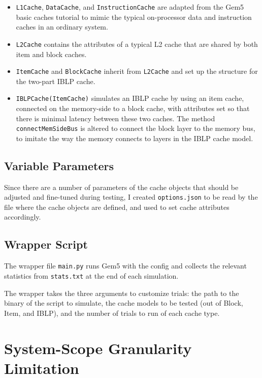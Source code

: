\documentclass[12pt,twoside]{reedthesis}
\begin{document}
	\begin{itemize}
		\item \verb`L1Cache`, \verb`DataCache`, and \verb`InstructionCache` are adapted from the Gem5 basic caches tutorial to mimic the typical on-processor data and instruction caches in an ordinary system.
	
		\item \verb`L2Cache` contains the attributes of a typical L2 cache that are shared by both item and block caches.
	
		\item \verb`ItemCache` and \verb`BlockCache` inherit from \verb`L2Cache` and set up the structure for the two-part IBLP cache.
	
		\item \verb`IBLPCache(ItemCache)` simulates an IBLP cache by using an item cache, connected on the memory-side to a block cache, with attributes set so that there is minimal latency between these two caches. The method \verb`connectMemSideBus` is altered to connect the block layer to the memory bus, to imitate the way the memory connects to layers in the IBLP cache model.
	\end{itemize}

	\subsection*{Variable Parameters}

	Since there are a number of parameters of the cache objects that should be adjusted and fine-tuned during testing, I created \verb`options.json` to be read by the file where the cache objects are defined, and used to set cache attributes accordingly.

	\subsection*{Wrapper Script}

	The wrapper file \verb`main.py` runs Gem5 with the config and collects the relevant statistics from \verb`stats.txt` at the end of each simulation.

	The wrapper takes the three arguments to customize trials: the path to the binary of the script to simulate, the cache models to be tested (out of Block, Item, and IBLP), and the number of trials to run of each cache type.

\section{System-Scope Granularity Limitation}
\end{document}
